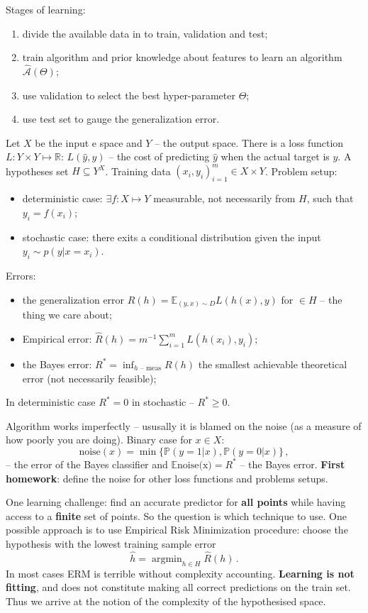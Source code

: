 \documentclass[a4paper]{article}
\newcommand{\Real}{\mathbb{R}}
\newcommand{\ex}{\mathbb{E}}
\newcommand{\pr}{\mathbb{P}}
\newcommand{\argmin}{\mathop{\text{argmin}}}
\begin{document}
Stages of learning: \begin{enumerate}
    \item divide the available data in to train, validation and test;
    \item train algorithm and prior knowledge about features to learn an algorithm
    $\hat{\mathcal{A}}(\Theta)$;
    \item use validation to select the best hyper-parameter $\Theta$;
    \item use test set to gauge the generalization error.
\end{enumerate}

Let $X$ be the input e space and $Y$ -- the output space. There is a loss function
$L: Y\times Y \mapsto \Real$: $L(\hat{y}, y)$ -- the cost of predicting $\hat{y}$
when the actual target is $y$. A hypotheses set $H\subseteq Y^X$. Training data
$(x_i,y_i)_{i=1}^m \in X\times Y$.
Problem setup: \begin{itemize}
    \item deterministic case: $\exists f:X\mapsto Y$ measurable, not necessarily from
    $H$, such that $y_i = f(x_i)$;
    \item stochastic case: there exits a conditional distribution given the
    input \\$y_i \sim p(y|x=x_i)$.
\end{itemize}

Errors: \begin{itemize}
    \item the generalization error $R(h) = \ex_{(y, x)\sim D} L(h(x), y)$ for $\in H$
    -- the thing we care about;
    \item Empirical error: $\hat{R}(h) = m^{-1} \sum_{i=1}^m L(h(x_i), y_i)$;
    \item the Bayes error: $R^* = \inf_{h \text{ -- meas}} R(h)$ the smallest achievable
    theoretical error (not necessarily feasible);
\end{itemize}
In deterministic case $R^*=0$ in stochastic -- $R^*\geq 0$.

Algorithm works imperfectly -- ususally it is blamed on the noise (as a measure of
how poorly you are doing). Binary case for $x\in X$:
\[ \text{noise}(x) = \min\bigl\{\pr(y=1|x), \pr(y=0|x)\bigr\} \,, \]
-- the error of the Bayes classifier and $\ex \text{noise(x)} = R^*$ -- the Bayes
error.
\textbf{First homework}: define the noise for other loss functions and problems
setups.

One learning challenge: find an accurate predictor for \textbf{all points} while
having access to a \textbf{finite} set of points. So the question is which technique
to use. One possible approach is to use Empirical Risk Minimization procedure:
choose the hypothesis with the lowest training sample error
\[ \hat{h} = \argmin_{h\in H} \hat{R}(h) \,. \]
In most cases ERM is terrible without complexity accounting. \textbf{Learning is not
fitting}, and does not constitute making all correct predictions on the train set.
Thus we arrive at the notion of the complexity of the hypothesised space.
\end{document}
